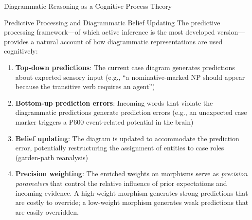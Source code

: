 \documentclass[
  ignorenonframetext,
]{beamer}
\begin{document}
\begin{frame}{Diagrammatic Reasoning as a Cognitive Process Theory}
\begin{block}{Predictive Processing and Diagrammatic Belief Updating}
\protect{}\label{predictive-processing-and-diagrammatic-belief-updating}
The predictive processing framework---of which active inference is the
most developed version---provides a natural account of how diagrammatic
representations are used cognitively:

\begin{enumerate}
\item
  \textbf{Top-down predictions}: The current case diagram generates
  predictions about expected sensory input (e.g., ``a nominative-marked
  NP should appear because the transitive verb requires an agent'')
\item
  \textbf{Bottom-up prediction errors}: Incoming words that violate the
  diagrammatic predictions generate prediction errors (e.g., an
  unexpected case marker triggers a P600 event-related potential in the
  brain)
\item
  \textbf{Belief updating}: The diagram is updated to accommodate the
  prediction error, potentially restructuring the assignment of entities
  to case roles (garden-path reanalysis)
\item
  \textbf{Precision weighting}: The enriched weights on morphisms serve
  as \emph{precision parameters} that control the relative influence of
  prior expectations and incoming evidence. A high-weight morphism
  generates strong predictions that are costly to override; a low-weight
  morphism generates weak predictions that are easily overridden.
\end{enumerate}
\end{block}
\end{frame}
\end{document}
